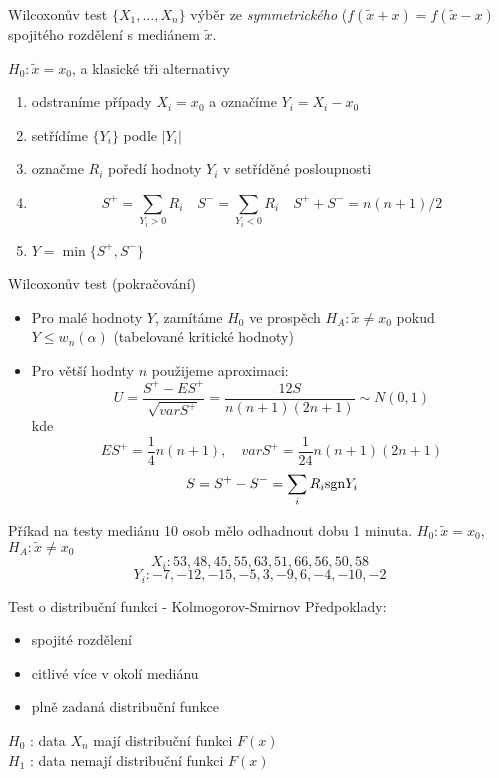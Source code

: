 \documentclass[smaller]{beamer}
\def\sgn{{\rm sgn}}
\def\abs#1{\lvert#1\rvert}
\def\xskip{{\vspace{2ex}}}
\begin{document}
\begin{frame}{Wilcoxonův test}
$\{X_1,\dots,X_n\}$ výběr ze {\it symmetrického} ($f(\tilde{x} + x) = f(\tilde{x} -x)$ spojitého rozdělení s mediánem $\tilde{x}$.

$H_0: \tilde{x} = x_0$, a klasické tři alternativy

\begin{enumerate}
 \item odstraníme případy $X_i = x_0$ a označíme $Y_i = X_i - x_0$
 \item setřídíme $\{Y_i\}$ podle $\abs{Y_i}$
 \item označme $R_i$ poředí hodnoty $Y_i$ v setříděné posloupnosti
 \item \[
          S^+ = \sum_{Y_i >0} R_i\quad  S^- = \sum_{Y_i <0} R_i\quad S^+ + S^- = n(n+1)/2
       \]
 \item $Y = \min\{S^+, S^-\}$
 
\end{enumerate}

\end{frame}

\begin{frame}{Wilcoxonův test (pokračování)}
 \begin{itemize}
  \item Pro malé hodnoty $Y$, zamítáme $H_0$ ve prospěch $H_A: \tilde{x} \ne x_0$ pokud $Y \le w_n(\alpha)$ (tabelované kritické hodnoty)
  \item Pro větší hodnty $n$ použijeme aproximaci:
  \[
    U = \frac{S^+ - ES^+}{\sqrt{var S^+}} = \frac{12 S}{n(n+1)(2n+1)} \sim N(0,1)
  \]
kde 
  \[
    ES^+ = \frac{1}{4}n(n+1),\quad var S^+ = \frac{1}{24}n(n+1)(2n+1)
  \]
  \[
    S = S^+ - S^- = \sum_{i} R_i \sgn Y_i
  \]
 \end{itemize}
\end{frame}


\begin{frame}{Příkad na testy mediánu}
10 osob mělo odhadnout dobu 1 minuta. $H_0: \tilde{x} = x_0$, $H_A: \tilde{x} \ne x_0$
\[
 X_i: 53, 48, 45, 55, 63, 51, 66, 56, 50, 58
\]
\[
 Y_i: -7, -12, -15, -5, 3, -9, 6, -4, -10, -2
\]



\end{frame}


\begin{frame}{Test o distribuční funkci - Kolmogorov-Smirnov}
  Předpoklady: 
  \begin{itemize}
   \item spojité rozdělení
   \item citlivé více v okolí mediánu
   \item plně zadaná distribuční funkce
  \end{itemize}

\xskip
  $H_0$ : data $X_n$ mají distribuční funkci $F(x)$\\
  $H_1$ : data nemají distribuční funkci $F(x)$
\end{frame}
\end{document}
